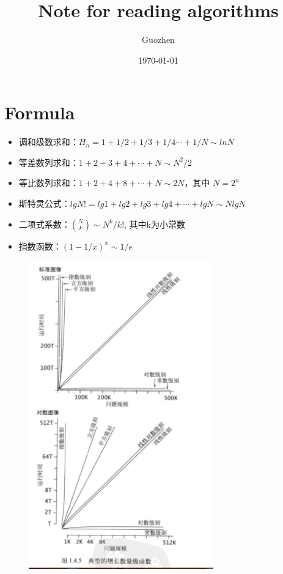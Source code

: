 \documentclass{article}
\begin{document}
\title{ Note for reading algorithms }
\author{Guozhen}
\date{\today}
\maketitle

\section{Formula}
\label{sec:Formula}

\begin{itemize}
\item 调和级数求和：$H_n=1+1/2+1/3+1/4 \cdots +1/N \sim lnN$
\item 等差数列求和：$1+2+3+4+ \cdots +N \sim N^2/2$
\item 等比数列求和：$1+2+4+8+ \cdots +N \sim 2N$，其中 $N=2^n$
\item 斯特灵公式：$lgN!=lg1+lg2+lg3+lg4+ \cdots +lgN \sim NlgN$
\item 二项式系数：$\binom{N}{k} \sim N^k/k!$, 其中k为小常数
\item 指数函数：$(1-1/x)^x \sim 1/e$
\end{itemize}

\begin{figure}
  \centering
  \includegraphics[width=8cm]{chart}
\end{figure}
\end{document}
